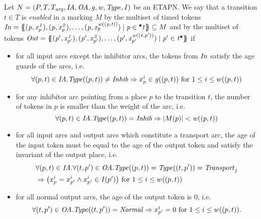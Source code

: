 \begin{definition}[(Enabledness)]
\label{def:enabledness}
 Let $N = (P, T, T_{\mathit{urg}}, \mathit{IA},\allowbreak \mathit{OA}, \mathit{g}, \mathit{w}, \mathit{Type}, \mathit{I})$ be an ETAPN. 
We say that a transition $t \in T$ is \emph{enabled} in a marking $M$ by the 
multiset of timed tokens \newline 
$\mathit{In} = \mathit{\{\!\!\{(p,x_{p}^1), (p,x_{p}^2), \dots ,(p,x_{p}^{\mathit{w} ((p,t))})\mid 
p \in {}^\bullet t\}\!\!\}} \subseteq M$ and by the multiset of tokens
$\mathit{Out} = \mathit{\{\!\!\{ (p^{\prime},x_{p^{\prime}}^1),
           (p^{\prime},x_{p^{\prime}}^2),
\dots ,\allowbreak
(p^{\prime},x_{p^{\prime}}^{\mathit{w} ((t,p^{\prime}))}) 
\mid p^{\prime} \in t^\bullet \}\!\!\}}$ if
\begin{itemize}
\item for all input arcs except the inhibitor arcs, the tokens from $\mathit{In}$ satisfy the age guards of the arcs, i.e. 
$$\forall(p,t) \in \mathit{IA}. \mathit{Type}((p,t)) \neq \mathit{Inhib} \Rightarrow  x_p^i \in \mathit{g}((p,t))\text{ for }1\leq i\leq w((p,t)) $$ 
\item for any inhibitor arc pointing from a place $p$ to the
transition $t$, the number of tokens in $p$ is smaller than the weight of the arc, i.e.
$$\forall(p,t) \in \mathit{IA}. \mathit{Type}((p,t)) = \mathit{Inhib} \Rightarrow|M(p)|<\mathit{w} ((p,t))$$ 
\item for all input arcs and output arcs which constitute a transport arc, 
the age of the input token must be equal to the age of the output token and satisfy the invariant of the output place, i.e.
\begin{eqnarray*}
&\forall(p,t) \in \mathit{IA}. \forall(t,p^{\prime}) \in \mathit{OA}.\mathit{Type}((p,t)) = \mathit{Type}((t,p^{\prime})) 
= \mathit{Transport}_j \\
&\Rightarrow \big( x_p^i = x_{p^{\prime}}^i \wedge x_{p^{\prime}}^i \in 
\mathit{I}(p^{\prime})\big) \text{ for } 1\leq i \leq w((p,t))
\end{eqnarray*}
\item for all normal output arcs, the age of the output token is $0$, i.e. $$\forall(t,p^{\prime}) \in \mathit{OA}. \mathit{Type}((t,p^{\prime})) = \mathit{Normal} \Rightarrow x_{p^{\prime}}^i = 0 \text{ for }1\leq i \leq w((p,t)).$$ 
\end{itemize}
\end{definition}

